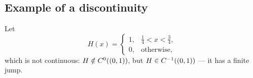 
\subsection*{Example of a discontinuity}

Let
\begin{equation}\label{eq:H}
  H(x)=\begin{cases}
    1, & \tfrac14 < x < \tfrac34,\\[2pt]
    0, & \text{otherwise,}
  \end{cases}
\end{equation}
which is not continuous: $H\notin\Ck[(0,1)]{0}$, but $H\in \Ck[(0,1)]{-1}$ ---
it has a finite jump.


